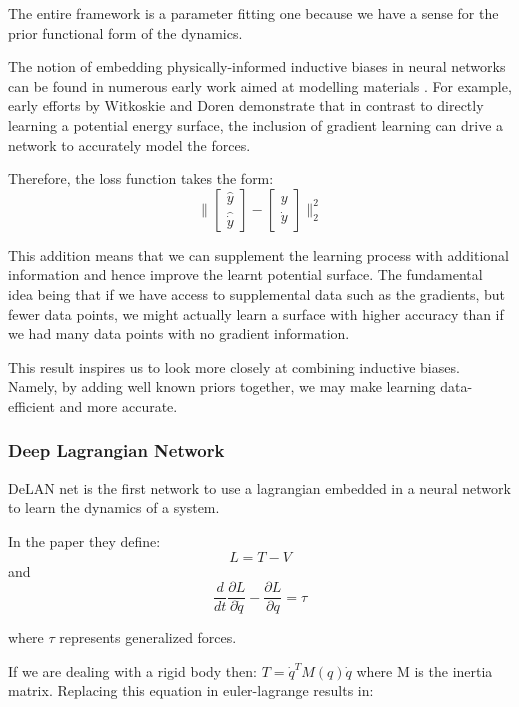 \documentclass{article}
\begin{document}
The entire framework is a parameter fitting one because we have a sense for the prior functional form of the dynamics.

The notion of embedding physically-informed inductive biases in neural networks can be found in numerous early work aimed at modelling materials \cite{witkoskie_neural_2005, pukrittayakamee_simultaneous_2009, smith_ani-1_2017, rupp_fast_2012, yao_tensormol-01_2018}. For example, early efforts by Witkoskie and Doren \cite{witkoskie_neural_2005} demonstrate that in contrast to directly learning a potential energy surface, the inclusion of gradient learning can drive a network to accurately model the forces. 

Therefore, the loss function takes the form:
$$
\Bigg\|
\begin{bmatrix}
\hat{y} \\
\hat{\dot{y}}
\end{bmatrix}
-
\begin{bmatrix}
y \\
\dot{y}
\end{bmatrix}
\Bigg\|_2^2
$$

This addition means that we can supplement the learning process with additional information and hence improve the learnt potential surface. The fundamental idea being that if we have access to supplemental data such as the gradients, but fewer data points, we might actually learn a surface with higher accuracy than if we had many data points with no gradient information. 

This result inspires us to look more closely at combining inductive biases. Namely, by adding well known priors together, we may make learning data-efficient and more accurate.


\subsubsection*{Deep Lagrangian Network}

DeLAN net is the first network to use a lagrangian embedded in a neural network to learn the dynamics of a system. 

In the paper they define:
$$ L = T - V$$
and
$$ \frac{d}{dt}\frac{\partial L}{\partial \dot{q}} - \frac{\partial L}{\partial q} = \tau $$

where $\tau$ represents generalized forces.

If we are dealing with a rigid body then: $ T = \dot{q}^T M(q) \dot{q} $ where M is the inertia matrix. Replacing this equation in euler-lagrange results in:
\end{document}
